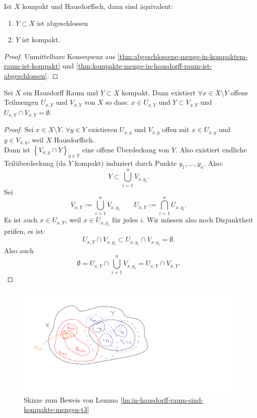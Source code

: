 \begin{corollary}\label{cor:abgeschlossen-gdw-kompakt-in-kompaktem-hausdorff-raum}
    Ist $X$ kompakt und Hausdorffsch, dann sind äquivalent:
\begin{enumerate}[1)]
        \item $Y\subset X$ ist abgeschlossen
        \item $Y$ ist kompakt.
    \end{enumerate}
\end{corollary}
\begin{proof}
    Unmittelbare Konsequenz aus \autoref{thm:abgeschlossene-menge-in-kompaktem-raum-ist-kompakt} und \autoref{thm:kompakte-menge-in-hausdorff-raum-ist-abgeschlossen}.
\end{proof}
\begin{lemma}\label{lm:in-hausdorff-raum-sind-kompakte-mengen-t3}
    Sei $X$ ein Hausdorff Raum und  $Y\subset X$ kompakt. Dann existiert $\forall x\in X\setminus Y$ offene Teilmengen $U_{x,Y}$ und $V_{x,Y}$ von $X$ so dass:  $x\in U_{x,Y}$ und $Y\subset V_{x,Y}$ und $U_{x,Y} \cap V_{x,Y} = \emptyset$.
\end{lemma}
\begin{proof}
    Sei $x\in X\setminus Y$. $\forall y\in Y$ existieren $U_{x,y}$ und $V_{x,y}$ offen mit $x\in U_{x,y}$ und $y\in V_{x,y}$, weil $X$ Hausdorffsch. \\
    Dann ist  $\left \{V_{x,y} \cap Y\right\} _{y\in Y}$ eine offene Überdeckung von $Y$. Also existiert endliche Teilüberdeckung (da  $Y$ kompakt) induziert durch Punkte  $y_1,\ldots,y_n$. Also:
    \[
    Y\subset \bigcup_{i=1}^n V_{x,y_i}
    .\] 
    Sei
    \[
    V_{x,Y} := \bigcup_{i=1}^n V_{x,y_i} \qquad U_{x,Y} := \bigcap_{i=1}^n U_{x,y_i} 
    .\] 
    Es ist auch $x\in U_{x,Y}$, weil $x\in U_{x,y_i}$ für jedes $i$. Wir müssen also noch Disjunktheit prüfen, es ist:
     \[
    U_{x,Y} \cap V_{x,y_i} \subset U_{x,y_i} \cap V_{x,y_i} = \emptyset
    .\] 
    Also auch
    \[
        \emptyset=    U_{x,Y} \cap \bigcup_{i=1}^n V_{x,y_i} = U_{x,Y} \cap V_{x,Y}
    .\]
\end{proof}
    \begin{figure}[H]
    \includegraphics[scale=0.4]{figures/Lemma5.5.pdf}
    \caption{Skizze zum Beweis von Lemma \ref{lm:in-hausdorff-raum-sind-kompakte-mengen-t3}}
\end{figure}
